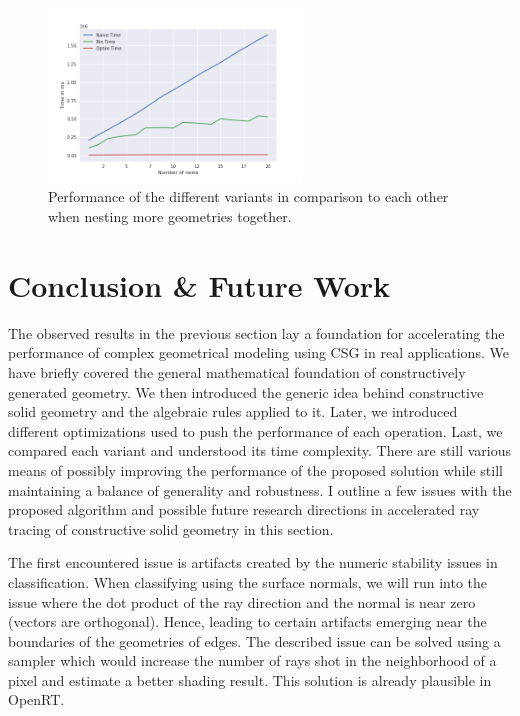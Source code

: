 \documentclass[a4paper,11pt,oneside]{article}
\begin{document}
\begin{figure}[H]
	\centering
	\includegraphics[width=0.6\textwidth]{section5/plots/test_nesting.png}
	\caption{Performance of the different variants in comparison to each other when nesting more geometries together.}
	\label{sec5.2:test_nesting}
\end{figure}



\section{Conclusion \& Future Work}


The observed results in the previous section lay a foundation for accelerating the performance of complex geometrical modeling using CSG in real applications. We have briefly covered the general mathematical foundation of constructively generated geometry. We then introduced the generic idea behind constructive solid geometry and the algebraic rules applied to it. Later, we introduced different optimizations used to push the performance of each operation. Last, we compared each variant and understood its time complexity. There are still various means of possibly improving the performance of the proposed solution while still maintaining a balance of generality and robustness. I outline a few issues with the proposed algorithm and possible future research directions in accelerated ray tracing of constructive solid geometry in this section.

The first encountered issue is artifacts created by the numeric stability issues in classification. When classifying using the surface normals, we will run into the issue where the dot product of the ray direction and the normal is near zero (vectors are orthogonal). Hence, leading to certain artifacts emerging near the boundaries of the geometries of edges. The described issue can be solved using a sampler which would increase the number of rays shot in the neighborhood of a pixel and estimate a better shading result. This solution is already plausible in OpenRT.
\end{document}
